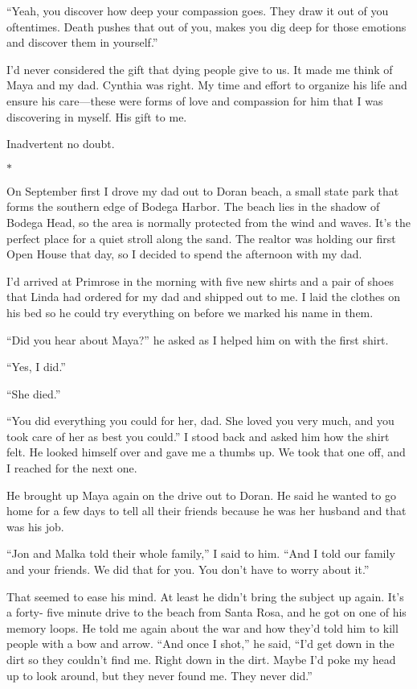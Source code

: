 \documentclass[12pt]{book}
\begin{document}
``Yeah, you discover how deep your compassion goes. They draw it out of you oftentimes. Death pushes that out of you, makes you dig deep for those emotions and discover them in yourself.''

I'd never considered the gift that dying people give to us. It made me think of Maya and my dad. Cynthia was right. My time and effort to organize his life and ensure his care---these were forms of love and compassion for him that I was discovering in myself. His gift to me.

Inadvertent no doubt.

\begin{center}$*$\end{center}

On September first I drove my dad out to Doran beach, a small state park that forms the southern edge of Bodega Harbor. The beach lies in the shadow of Bodega Head, so the area is normally protected from the wind and waves. It's the perfect place for a quiet stroll along the sand. The realtor was holding our first Open House that day, so I decided to spend the afternoon with my dad.

I'd arrived at Primrose in the morning with five new shirts and a pair of shoes that Linda had ordered for my dad and shipped out to me. I laid the clothes on his bed so he could try everything on before we marked his name in them.

``Did you hear about Maya?'' he asked as I helped him on with the first shirt.

``Yes, I did.''

``She died.''

``You did everything you could for her, dad. She loved you very much, and you took care of her as best you could.'' I stood back and asked him how the shirt felt. He looked himself over and gave me a thumbs up. We took that one off, and I reached for the next one.

He brought up Maya again on the drive out to Doran. He said he wanted to go home for a few days to tell all their friends because he was her husband and that was his job.

``Jon and Malka told their whole family,'' I said to him. ``And I told our family and your friends. We did that for you. You don't have to worry about it.''

That seemed to ease his mind. At least he didn't bring the subject up again. It's a forty- five minute drive to the beach from Santa Rosa, and he got on one of his memory loops. He told me again about the war and how they'd told him to kill people with a bow and arrow. ``And once I shot,'' he said, ``I'd get down in the dirt so they couldn't find me. Right down in the dirt. Maybe I'd poke my head up to look around, but they never found me. They never did.''
\end{document}
